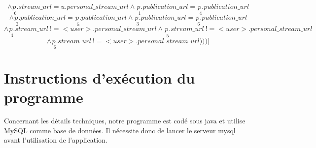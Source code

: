 \documentclass[a4paper,10pt]{article}
\begin{document}
\begin{enumerate}
{\begin{minipage}{1.0\textwidth}
		\begin{equation}
                   \wedge \underset{\ \ 6}{p}.stream\_url = u.personal\_stream\_url \wedge \underset{\ \ 1}{p}.publication\_url =  \underset{\ \ 4}{p}.publication\_url 
		\end{equation}
		\begin{equation}
		\wedge \underset{\ \ 2}{p}.publication\_url =  \underset{\ \ 5}{p}.publication\_url \wedge \underset{\ \ 3}{p}.publication\_url =  \underset{\ \ 6}{p}.publication\_url 
		\end{equation}
		\begin{equation}
		\wedge \underset{\ \ 4}{p}.stream\_url  \ !=  <user>.personal\_stream\_url \wedge \underset{\ \ 5}{p}.stream\_url  \ !=  <user>.personal\_stream\_url
		\end{equation}
		\begin{equation}
		\wedge \underset{\ \ 6}{p}.stream\_url  \ !=  <user>.personal\_stream\_url)))]
		\end{equation}
         \end{minipage}}
	\end{enumerate}

\section{Instructions d'exécution du programme}

Concernant les détails techniques, notre programme est codé sous java et utilise MySQL comme base de données. Il nécessite donc de lancer le serveur mysql avant l'utilisation de l'application.
\end{document}
